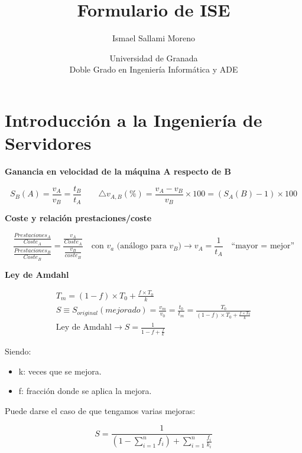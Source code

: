 \documentclass[a4paper,12pt]{article}
\title{\textbf{Formulario de ISE}}
\author{Ismael Sallami Moreno}
\date{\small Universidad de Granada\\ Doble Grado en Ingeniería Informática y ADE}
\begin{document}
\maketitle
\thispagestyle{fancy}

\vspace{1cm}

\section*{Introducción a la Ingeniería de Servidores}

\textbf{Ganancia en velocidad de la máquina A respecto de B}
\begin{tcolorbox}[colback=yellow!5!white, colframe=yellow!75!black]
$$
S_B(A) = \frac{v_A}{v_B} = \frac{t_B}{t_A} \quad \quad \triangle v_{A,B}(\%) = \frac{v_A-v_B}{v_B} \times 100 = (S_A(B) - 1) \times 100
$$
\end{tcolorbox}

\textbf{Coste y relación prestaciones/coste}

\begin{tcolorbox}[colback=yellow!5!white, colframe=yellow!75!black]
    $$
    \frac{\frac{Prestaciones_A}{Coste_A}}{\frac{Prestaciones_B}{Coste_B}} = \frac{\frac{v_A}{Coste_A}}{\frac{v_B}{coste_B}} \quad \text{con $v_a$ (análogo para $v_B$)} \rightarrow v_A = \frac{1}{t_A} \quad \text{``mayor = mejor''}
    $$
    \end{tcolorbox}


\textbf{Ley de Amdahl}

\begin{tcolorbox}[colback=yellow!5!white, colframe=yellow!75!black]
    \begin{align*}
        T_m = (1-f) \times T_0 + \frac{f\times T_0}{k} \\
        S \equiv S_{original}(mejorado) = \frac{v_m}{v_0} = \frac{t_0}{t_m} = \frac{T_0}{(1-f) \times T_0 + \frac{f\times T_0}{k}} \\
        \text{Ley de Amdahl} \rightarrow S = \frac{1}{1-f+\frac{f}{k}}
    \end{align*}
    \end{tcolorbox}
    Siendo:
\begin{itemize}
    \item k: veces que se mejora.
    \item f: fracción donde se aplica la mejora.
\end{itemize}

Puede darse el caso de que tengamos varias mejoras:
\begin{tcolorbox}[colback=yellow!5!white, colframe=yellow!75!black]
    $$
    S = \frac{1}{(1-\sum_{i=1}^n f_i)+ \sum_{i=1}^n \frac{f_i}{k_i}}
    $$
    \end{tcolorbox}
\end{document}
